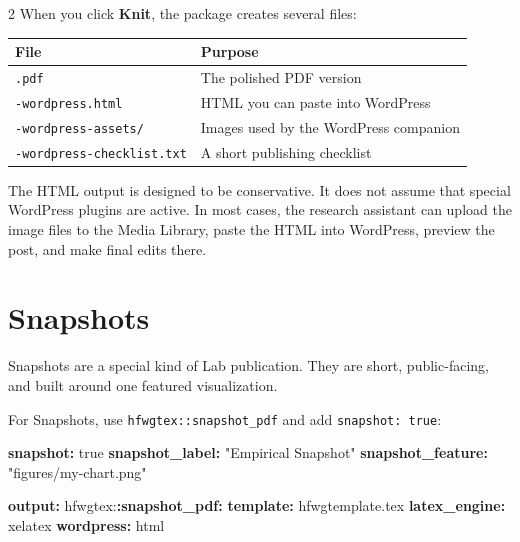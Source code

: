 \documentclass[12pt]{article}
\newenvironment{Shaded}{\begin{snugshade}}{\end{snugshade}}
\newcommand{\AttributeTok}[1]{\textcolor[rgb]{0.13,0.29,0.53}{#1}}
\newcommand{\CharTok}[1]{\textcolor[rgb]{0.31,0.60,0.02}{#1}}
\newcommand{\FunctionTok}[1]{\textcolor[rgb]{0.13,0.29,0.53}{\textbf{#1}}}
\newcommand{\KeywordTok}[1]{\textcolor[rgb]{0.13,0.29,0.53}{\textbf{#1}}}
\newcommand{\StringTok}[1]{\textcolor[rgb]{0.31,0.60,0.02}{#1}}
\renewenvironment{Shaded}{%
    \vspace{3pt}%
    \noindent\begin{minipage}{\linewidth}%
    \def\FrameCommand{%
      \hspace{1pt}%
      {\color{hfwgrule}\vrule width 3pt}%
      \hspace{4pt}%
      \colorbox{codeinputbg}%
    }%
    \MakeFramed{\advance\hsize by -\width \FrameRestore}%
    \footnotesize
    \setlength{\parskip}{0pt}%
    \setlength{\partopsep}{0pt}%
  }{%
    \endMakeFramed
    \end{minipage}%
    \vspace{3pt}%
  }
\def\FrameCommand{\fboxsep=4pt\colorbox{codeoutputbg}}%
\begin{document}
\begin{multicols}{2}
When you click \textbf{Knit}, the package creates several files:

{\def\LTcaptype{} %
\begin{longtable}[]{@{}ll@{}}
\toprule\noalign{}
File & Purpose \\
\midrule\noalign{}
\endhead
\bottomrule\noalign{}
\endlastfoot
\texttt{.pdf} & The polished PDF version \\
\texttt{-wordpress.html} & HTML you can paste into WordPress \\
\texttt{-wordpress-assets/} & Images used by the WordPress companion \\
\texttt{-wordpress-checklist.txt} & A short publishing checklist \\
\end{longtable}
}

The HTML output is designed to be conservative. It does not assume that
special WordPress plugins are active. In most cases, the research
assistant can upload the image files to the Media Library, paste the
HTML into WordPress, preview the post, and make final edits there.

\section{Snapshots}\label{snapshots}

Snapshots are a special kind of Lab publication. They are short,
public-facing, and built around one featured visualization.

For Snapshots, use \texttt{hfwgtex::snapshot\_pdf} and add
\texttt{snapshot:\ true}:

\begin{Shaded}
\begin{Highlighting}[]
\FunctionTok{snapshot}\KeywordTok{:}\AttributeTok{ }\CharTok{true}
\FunctionTok{snapshot\_label}\KeywordTok{:}\AttributeTok{ }\StringTok{"Empirical Snapshot"}
\FunctionTok{snapshot\_feature}\KeywordTok{:}\AttributeTok{ }\StringTok{"figures/my{-}chart.png"}

\FunctionTok{output}\KeywordTok{:}
\AttributeTok{  hfwgtex:}\FunctionTok{:snapshot\_pdf}\KeywordTok{:}
\AttributeTok{    }\FunctionTok{template}\KeywordTok{:}\AttributeTok{ hfwgtemplate.tex}
\AttributeTok{    }\FunctionTok{latex\_engine}\KeywordTok{:}\AttributeTok{ xelatex}
\AttributeTok{    }\FunctionTok{wordpress}\KeywordTok{:}\AttributeTok{ html}
\end{Highlighting}
\end{Shaded}


\end{multicols}
\end{document}

